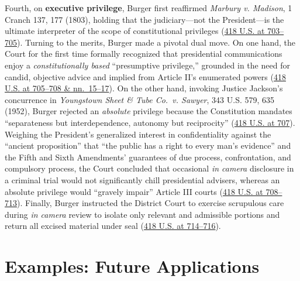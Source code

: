 \documentclass[12pt]{article}
\begin{document}
Fourth, on \textbf{executive privilege}, Burger first reaffirmed \textit{Marbury v. Madison}, 1 Cranch 137, 177 (1803), holding that the judiciary---not the President---is the ultimate interpreter of the scope of constitutional privileges (\href{https://supreme.justia.com/cases/federal/us/418/683/}{418 U.S. at 703--705}). Turning to the merits, Burger made a pivotal dual move. On one hand, the Court for the first time formally recognized that presidential communications enjoy a \textit{constitutionally based} ``presumptive privilege,'' grounded in the need for candid, objective advice and implied from Article II's enumerated powers (\href{https://supreme.justia.com/cases/federal/us/418/683/}{418 U.S. at 705--708 \& nn.\ 15--17}). On the other hand, invoking Justice Jackson's concurrence in \textit{Youngstown Sheet \& Tube Co.\ v. Sawyer}, 343 U.S. 579, 635 (1952), Burger rejected an \textit{absolute} privilege because the Constitution mandates ``separateness but interdependence, autonomy but reciprocity'' (\href{https://supreme.justia.com/cases/federal/us/418/683/}{418 U.S. at 707}). Weighing the President's generalized interest in confidentiality against the ``ancient proposition'' that ``the public has a right to every man's evidence'' and the Fifth and Sixth Amendments' guarantees of due process, confrontation, and compulsory process, the Court concluded that occasional \textit{in camera} disclosure in a criminal trial would not significantly chill presidential advisers, whereas an absolute privilege would ``gravely impair'' Article III courts (\href{https://supreme.justia.com/cases/federal/us/418/683/}{418 U.S. at 708--713}). Finally, Burger instructed the District Court to exercise scrupulous care during \textit{in camera} review to isolate only relevant and admissible portions and return all excised material under seal (\href{https://supreme.justia.com/cases/federal/us/418/683/}{418 U.S. at 714--716}).

\section{Examples: Future Applications}
\end{document}
